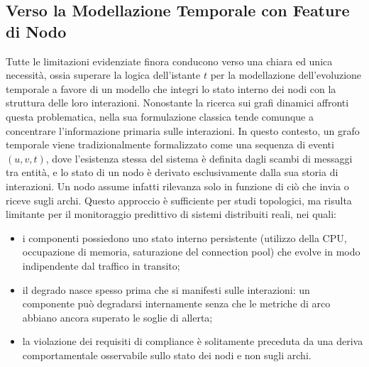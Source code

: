 \subsection{Verso la Modellazione Temporale con Feature di Nodo}
\label{subsec:atg_background}

Tutte le limitazioni evidenziate finora conducono verso una chiara ed unica necessità, ossia superare 
la logica dell'istante $t$ per la modellazione dell'evoluzione temporale a favore di un modello che integri 
lo stato interno dei nodi con la struttura delle loro interazioni. Nonostante la ricerca sui grafi dinamici 
affronti questa problematica, nella sua formulazione classica tende comunque a concentrare l'informazione 
primaria sulle interazioni. In questo contesto, un grafo temporale viene tradizionalmente formalizzato come 
una sequenza di eventi $(u, v, t)$, dove l'esistenza stessa del sistema è definita dagli scambi di messaggi 
tra entità, e lo stato di un nodo è derivato esclusivamente dalla sua storia di interazioni. 
Un nodo assume infatti rilevanza solo in funzione di ciò che invia o riceve sugli archi.
Questo approccio è sufficiente per studi topologici, ma risulta limitante per il monitoraggio
predittivo di sistemi distribuiti reali, nei quali:

\begin{itemize}
  \item i componenti possiedono uno stato interno persistente (utilizzo della \gls{CPU},
        occupazione di memoria, saturazione del connection pool) che evolve in modo
        indipendente dal traffico in transito;
  \item il degrado nasce spesso prima che si manifesti sulle interazioni: un componente
        può degradarsi internamente senza che le metriche di arco abbiano ancora superato
        le soglie di allerta;
  \item la violazione dei requisiti di compliance è solitamente preceduta da una deriva
        comportamentale osservabile sullo stato dei nodi e non sugli archi.
\end{itemize}


